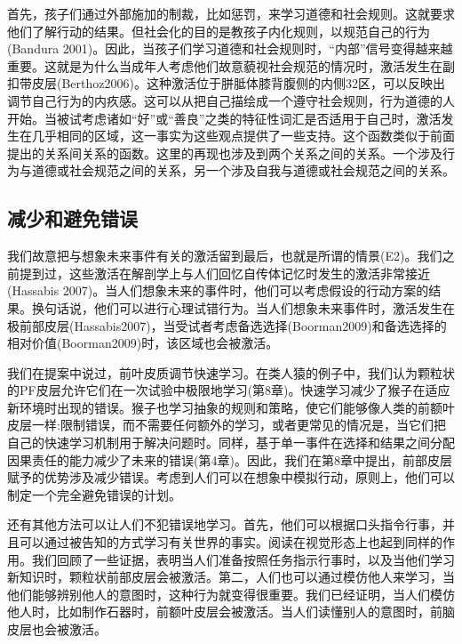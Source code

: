 首先，孩子们通过外部施加的制裁，比如惩罚，来学习道德和社会规则。这就要求他们了解行动的结果。但社会化的目的是教孩子内化规则，以规范自己的行为(Bandura 2001)。因此，当孩子们学习道德和社会规则时，“内部”信号变得越来越重要。这就是为什么当成年人考虑他们故意藐视社会规范的情况时，激活发生在副扣带皮层(Berthoz2006)。这种激活位于胼胝体膝背腹侧的内侧32区，可以反映出调节自己行为的内疚感。这可以从把自己描绘成一个遵守社会规则，行为道德的人开始。当被试考虑诸如“好”或“善良”之类的特征性词汇是否适用于自己时，激活发生在几乎相同的区域，这一事实为这些观点提供了一些支持。这个函数类似于前面提出的关系间关系的函数。这里的再现也涉及到两个关系之间的关系。一个涉及行为与道德或社会规范之间的关系，另一个涉及自我与道德或社会规范之间的关系。

\subsection{减少和避免错误}

我们故意把与想象未来事件有关的激活留到最后，也就是所谓的情景(E2)。我们之前提到过，这些激活在解剖学上与人们回忆自传体记忆时发生的激活非常接近(Hassabis 2007)。当人们想象未来的事件时，他们可以考虑假设的行动方案的结果。换句话说，他们可以进行心理试错行为。当人们想象未来事件时，激活发生在极前部皮层(Hassabis2007)，当受试者考虑备选选择(Boorman2009)和备选选择的相对价值(Boorman2009)时，该区域也会被激活。

我们在提案中说过，前叶皮质调节快速学习。在类人猿的例子中，我们认为颗粒状的PF皮层允许它们在一次试验中极限地学习(第8章)。快速学习减少了猴子在适应新环境时出现的错误。猴子也学习抽象的规则和策略，使它们能够像人类的前额叶皮层一样:限制错误，而不需要任何额外的学习，或者更常见的情况是，当它们把自己的快速学习机制用于解决问题时。同样，基于单一事件在选择和结果之间分配因果责任的能力减少了未来的错误(第4章)。因此，我们在第8章中提出，前部皮层赋予的优势涉及减少错误。考虑到人们可以在想象中模拟行动，原则上，他们可以制定一个完全避免错误的计划。

还有其他方法可以让人们不犯错误地学习。首先，他们可以根据口头指令行事，并且可以通过被告知的方式学习有关世界的事实。阅读在视觉形态上也起到同样的作用。我们回顾了一些证据，表明当人们准备按照任务指示行事时，以及当他们学习新知识时，颗粒状前部皮层会被激活。第二，人们也可以通过模仿他人来学习，当他们能够辨别他人的意图时，这种行为就变得很重要。我们已经证明，当人们模仿他人时，比如制作石器时，前额叶皮层会被激活。当人们读懂别人的意图时，前脑皮层也会被激活。

